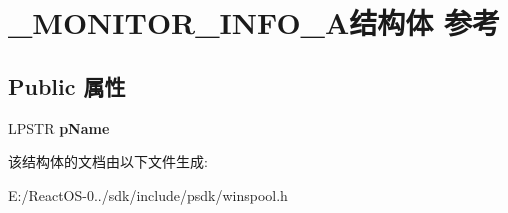 \hypertarget{struct___m_o_n_i_t_o_r___i_n_f_o__1_a}{}\section{\+\_\+\+M\+O\+N\+I\+T\+O\+R\+\_\+\+I\+N\+F\+O\+\_\+A结构体 参考}
\label{struct___m_o_n_i_t_o_r___i_n_f_o__1_a}
\subsection*{Public 属性}
\begin{DoxyCompactItemize}
\item 
\mbox{\label{struct___m_o_n_i_t_o_r___i_n_f_o__1_a_abd51a121d02b8913912bf2b5852b140d}} 
L\+P\+S\+TR {\bfseries p\+Name}
\end{DoxyCompactItemize}


该结构体的文档由以下文件生成\+:\begin{DoxyCompactItemize}
\item 
E\+:/\+React\+O\+S-\/0../sdk/include/psdk/winspool.\+h\end{DoxyCompactItemize}
